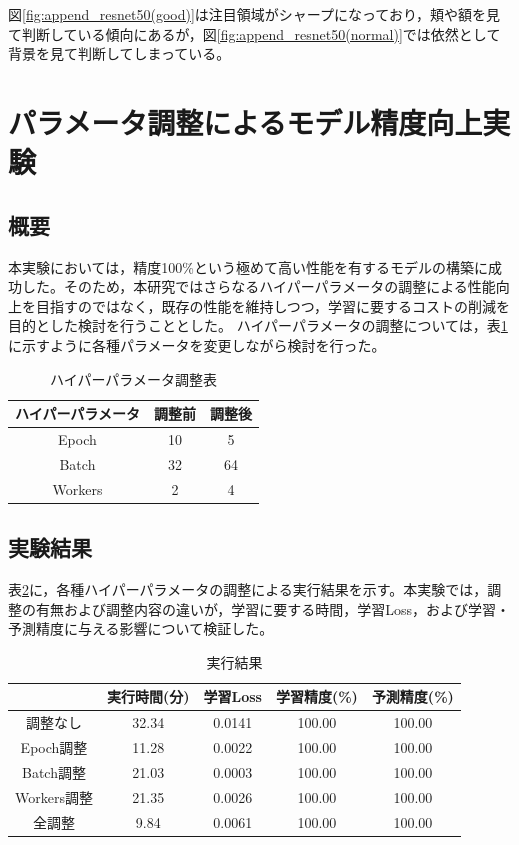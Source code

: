 \documentclass[a4paper,11pt,titlepage]{jsarticle}
\begin{document}
図\ref{fig:append_resnet50(good)}は注目領域がシャープになっており，頬や額を見て判断している傾向にあるが，図\ref{fig:append_resnet50(normal)}では依然として背景を見て判断してしまっている。


\section{パラメータ調整によるモデル精度向上実験}
\subsection{概要}
本実験においては，精度100\%という極めて高い性能を有するモデルの構築に成功した。そのため，本研究ではさらなるハイパーパラメータの調整による性能向上を目指すのではなく，既存の性能を維持しつつ，学習に要するコストの削減を目的とした検討を行うこととした。
ハイパーパラメータの調整については，表\ref{hyper table}に示すように各種パラメータを変更しながら検討を行った。
\begin{table}[httb]
\centering
\caption{ハイパーパラメータ調整表}
\label{hyper table}
\begin{tabular}{|c|c|c|}
\hline
ハイパーパラメータ& 調整前& 調整後 \\
\hline
Epoch&10&5 \\
\hline
Batch&32&64 \\
\hline
Workers&2&4 \\
\hline
\end{tabular}
\end{table}

\subsection{実験結果}

表\ref{hyper result}に，各種ハイパーパラメータの調整による実行結果を示す。本実験では，調整の有無および調整内容の違いが，学習に要する時間，学習Loss，および学習・予測精度に与える影響について検証した。

\begin{table}[httb]
\centering
\caption{実行結果}
\label{hyper result}
\begin{tabular}{|c|c|c|c|c|}
\hline
&実行時間(分)&学習Loss&学習精度(\%)&予測精度(\%)\\
\hline
調整なし&32.34&0.0141&100.00&100.00\\
\hline
Epoch調整&11.28&0.0022&100.00&100.00\\
\hline
Batch調整&21.03&0.0003&100.00&100.00\\
\hline
Workers調整&21.35&0.0026&100.00&100.00\\
\hline
全調整&9.84&0.0061&100.00&100.00\\
\hline
\end{tabular}
\end{table}
\end{document}
